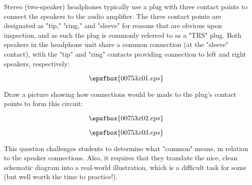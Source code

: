 

Stereo (two-speaker) headphones typically use a plug with three contact points to connect the speakers to the audio amplifier.  The three contact points are designated as "tip," "ring," and "sleeve" for reasons that are obvious upon inspection, and as such the plug is commonly referred to as a "TRS" plug.  Both speakers in the headphone unit share a common connection (at the "sleeve" contact), with the "tip" and "ring" contacts providing connection to left and right speakers, respectively:


$$\epsfbox{00753x01.eps}$$

Draw a picture showing how connections would be made to the plug's contact points to form this circuit:

$$\epsfbox{00753x02.eps}$$







$$\epsfbox{00753x03.eps}$$







This question challenges students to determine what "common" means, in relation to the speaker connections.  Also, it requires that they translate the nice, clean schematic diagram into a real-world illustration, which is a difficult task for some (but well worth the time to practice!).




